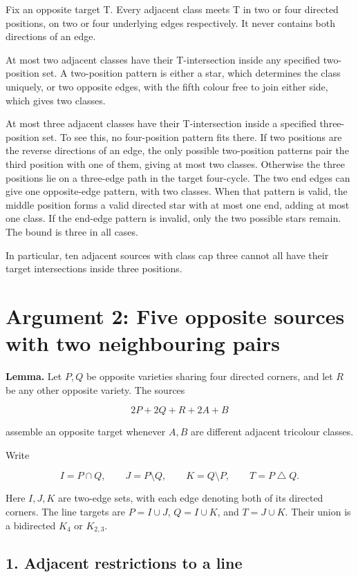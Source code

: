 \documentclass[
  10pt,
]{article}
\begin{document}
Fix an opposite target T. Every adjacent class meets T in two or four
directed positions, on two or four underlying edges respectively. It
never contains both directions of an edge.

At most two adjacent classes have their T-intersection inside any
specified two-position set. A two-position pattern is either a star,
which determines the class uniquely, or two opposite edges, with the
fifth colour free to join either side, which gives two classes.

At most three adjacent classes have their T-intersection inside a
specified three-position set. To see this, no four-position pattern fits
there. If two positions are the reverse directions of an edge, the only
possible two-position patterns pair the third position with one of them,
giving at most two classes. Otherwise the three positions lie on a
three-edge path in the target four-cycle. The two end edges can give one
opposite-edge pattern, with two classes. When that pattern is valid, the
middle position forms a valid directed star with at most one end, adding
at most one class. If the end-edge pattern is invalid, only the two
possible stars remain. The bound is three in all cases.

In particular, ten adjacent sources with class cap three cannot all have
their target intersections inside three positions.

\hypertarget{arg-2}{%
\section{Argument 2: Five opposite sources with two neighbouring
pairs}\label{arg-2}}

\textbf{Lemma.} Let \(P,Q\) be opposite varieties sharing four directed
corners, and let \(R\) be any other opposite variety. The sources

\[
2P+2Q+R+2A+B
\]

assemble an opposite target whenever \(A,B\) are different adjacent
tricolour classes.

Write

\[
I=P\cap Q,\qquad J=P\setminus Q,\qquad K=Q\setminus P,
\qquad T=P\mathbin\triangle Q.
\]

Here \(I,J,K\) are two-edge sets, with each edge denoting both of its
directed corners. The line targets are \(P=I\cup J\), \(Q=I\cup K\), and
\(T=J\cup K\). Their union is a bidirected \(K_4\) or \(K_{2,3}\).

\hypertarget{adjacent-restrictions-to-a-line}{%
\subsection*{1. Adjacent restrictions to a
line}\label{adjacent-restrictions-to-a-line}}
\end{document}
